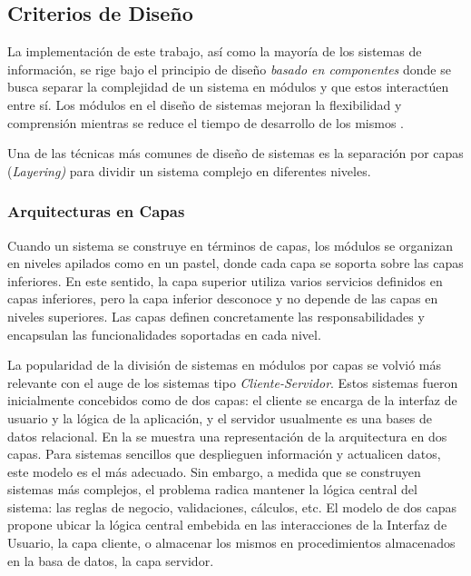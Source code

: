 \subsection{Criterios de Diseño}

\label{ssec52:criterios-dise=0000F1o}La implementación de este trabajo,
así como la mayoría de los sistemas de información, se rige bajo el
principio de diseño \emph{basado en componentes} donde se busca separar
la complejidad de un sistema en módulos y que estos interactúen entre
sí. Los módulos en el diseño de sistemas mejoran la flexibilidad y
comprensión mientras se reduce el tiempo de desarrollo de los mismos
\cite{Parnas1972}.

Una de las técnicas más comunes de diseño de sistemas\emph{ }es la
separación por capas (\emph{Layering)} para dividir un sistema complejo
\cite{Fowler2002} en diferentes niveles. 

\subsubsection{Arquitecturas en Capas}

Cuando un sistema se construye en términos de capas, los módulos se
organizan en niveles apilados como en un pastel, donde cada capa se
soporta sobre las capas inferiores. En este sentido, la capa superior
utiliza varios servicios definidos en capas inferiores, pero la capa
inferior desconoce y no depende de las capas en niveles superiores.
Las capas definen concretamente las responsabilidades y encapsulan
las funcionalidades soportadas en cada nivel.

La popularidad de la división de sistemas en módulos por capas se
volvió más relevante con el auge de los sistemas tipo \emph{Cliente-Servidor}.
Estos sistemas fueron inicialmente concebidos como de dos capas: el
cliente se encarga de la interfaz de usuario y la lógica de la aplicación,
y el servidor usualmente es una bases de datos relacional. En la 
se muestra una representación de la arquitectura en dos capas. Para
sistemas sencillos que desplieguen información y actualicen datos,
este modelo es el más adecuado. Sin embargo, a medida que se construyen
sistemas más complejos, el problema radica mantener la lógica central
del sistema: las reglas de negocio, validaciones, cálculos, etc. El
modelo de dos capas propone ubicar la lógica central embebida en las
interacciones de la Interfaz de Usuario, la capa cliente, o almacenar
los mismos en procedimientos almacenados en la basa de datos, la capa
servidor.

